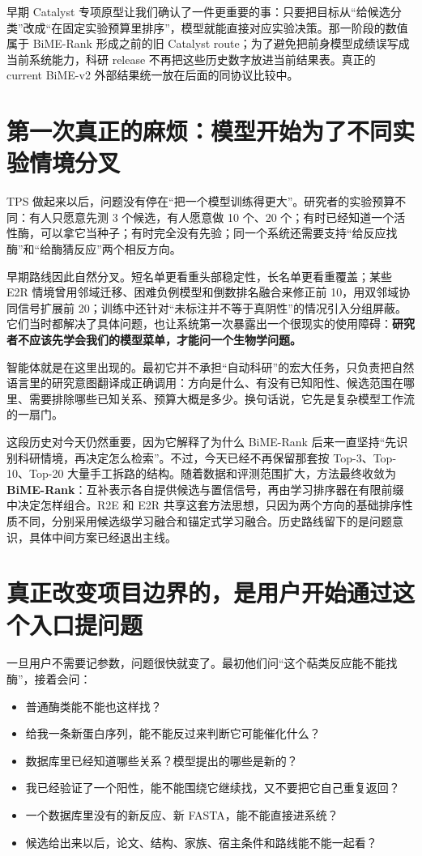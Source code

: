 \documentclass[11pt,a4paper]{ctexart}
\begin{document}
早期 Catalyst 专项原型让我们确认了一件更重要的事：只要把目标从“给候选分类”改成“在固定实验预算里排序”，模型就能直接对应实验决策。那一阶段的数值属于 BiME-Rank 形成之前的旧 Catalyst route；为了避免把前身模型成绩误写成当前系统能力，科研 release 不再把这些历史数字放进当前结果表。真正的 current BiME-v2 外部结果统一放在后面的同协议比较中。

\section{第一次真正的麻烦：模型开始为了不同实验情境分叉}

TPS 做起来以后，问题没有停在“把一个模型训练得更大”。研究者的实验预算不同：有人只愿意先测 3 个候选，有人愿意做 10 个、20 个；有时已经知道一个活性酶，可以拿它当种子；有时完全没有先验；同一个系统还需要支持“给反应找酶”和“给酶猜反应”两个相反方向。

早期路线因此自然分叉。短名单更看重头部稳定性，长名单更看重覆盖；某些 E2R 情境曾用邻域迁移、困难负例模型和倒数排名融合来修正前 10，用双邻域协同信号扩展前 20；训练中还针对“未标注并不等于真阴性”的情况引入分组屏蔽。它们当时都解决了具体问题，也让系统第一次暴露出一个很现实的使用障碍：\textbf{研究者不应该先学会我们的模型菜单，才能问一个生物学问题。}

智能体就是在这里出现的。最初它并不承担“自动科研”的宏大任务，只负责把自然语言里的研究意图翻译成正确调用：方向是什么、有没有已知阳性、候选范围在哪里、需要排除哪些已知关系、预算大概是多少。换句话说，它先是复杂模型工作流的一扇门。

这段历史对今天仍然重要，因为它解释了为什么 BiME-Rank 后来一直坚持“先识别科研情境，再决定怎么检索”。不过，今天已经不再保留那套按 Top-3、Top-10、Top-20 大量手工拆路的结构。随着数据和评测范围扩大，方法最终收敛为 \textbf{BiME-Rank}：互补表示各自提供候选与置信信号，再由学习排序器在有限前缀中决定怎样组合。R2E 和 E2R 共享这套方法思想，只因为两个方向的基础排序性质不同，分别采用候选级学习融合和锚定式学习融合。历史路线留下的是问题意识，具体中间方案已经退出主线。

\section{真正改变项目边界的，是用户开始通过这个入口提问题}

一旦用户不需要记参数，问题很快就变了。最初他们问“这个萜类反应能不能找酶”，接着会问：

\begin{itemize}
  \item 普通酶类能不能也这样找？
  \item 给我一条新蛋白序列，能不能反过来判断它可能催化什么？
  \item 数据库里已经知道哪些关系？模型提出的哪些是新的？
  \item 我已经验证了一个阳性，能不能围绕它继续找，又不要把它自己重复返回？
  \item 一个数据库里没有的新反应、新 FASTA，能不能直接进系统？
  \item 候选给出来以后，论文、结构、家族、宿主条件和路线能不能一起看？
\end{itemize}
\end{document}
